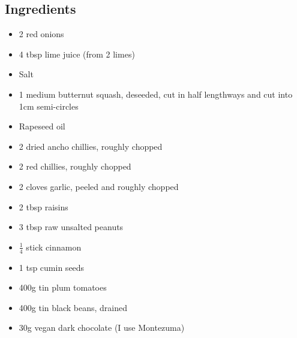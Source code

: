 \documentclass{book}
\begin{document}
\subsection*{Ingredients}
\begin{itemize}
\item 2 red onions
\item 4 tbsp lime juice (from 2 limes)
\item Salt
\item 1 medium butternut squash, deseeded, cut in half lengthways and cut into 1cm semi-circles 
\item Rapeseed oil 
\item 2 dried ancho chillies, roughly chopped 
\item 2 red chillies, roughly chopped
\item 2 cloves garlic, peeled and roughly chopped 
\item 2 tbsp raisins 
\item 3 tbsp raw unsalted peanuts
\item $\frac{1}{4}$ stick cinnamon 
\item 1 tsp cumin seeds 
\item 400g tin plum tomatoes 
\item 400g tin black beans, drained
\item 30g vegan dark chocolate (I use Montezuma) 
\end{itemize}
\end{document}

